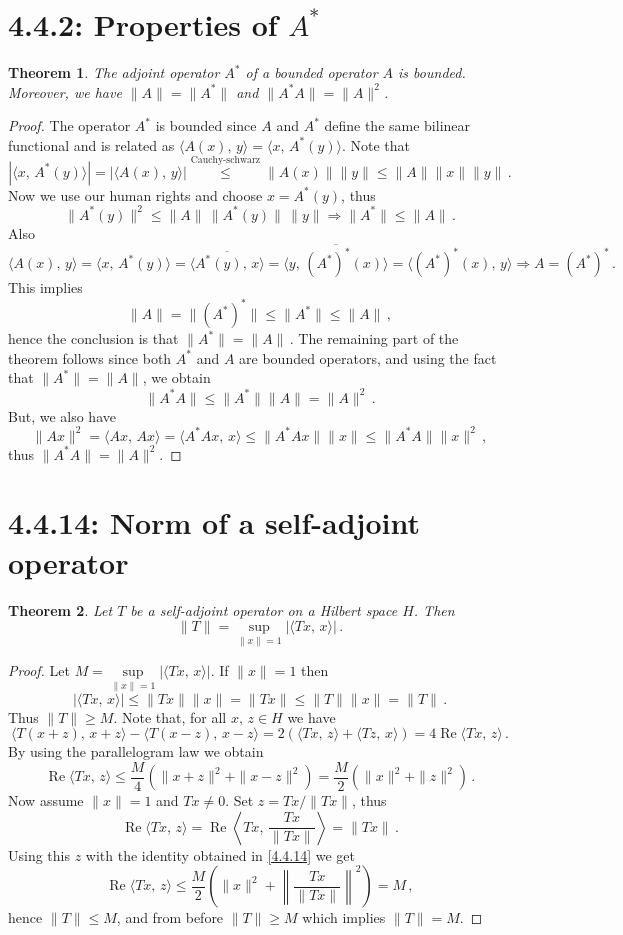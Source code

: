 \documentclass[12pt, a4paper]{article}
\newtheorem{theorem}{Theorem}[section]
\begin{document}
\section{4.4.2: Properties of $A^*$}
\begin{theorem}
The adjoint operator $A^*$ of a bounded operator $A$ is bounded. Moreover, we have $\|A\|=\|A^*\|$ and $\|A^*A\|=\|A\|^2$.
\end{theorem}
\begin{proof}
The operator $A^*$ is bounded since $A$ and $A^*$ define the same bilinear functional and is related as $\langle A(x),\,y\rangle=\langle x,\,A^*(y)\rangle$. Note that
\[
    |\langle x,\,A^*(y)\rangle|=|\langle A(x),\,y\rangle|\overset{\text{Cauchy-schwarz}}{\leq}\|A(x)\|\|y\|\leq \|A\|\|x\|\|y\|\,.
\]
Now we use our human rights and choose $x=A^*(y)$, thus
\[
    \|A^*(y)\|^2\leq \|A\|\,\|A^*(y)\|\,\|y\|\Rightarrow \|A^*\|\leq \|A\|\,.
\]
Also
\[
    \langle A(x),\,y\rangle=\langle x,\,A^*(y)\rangle=\langle\overline{A^*(y),\,x} \rangle=\langle\overline{y,\,(A^*)^*(x)} \rangle=\langle (A^*)^*(x),\,y\rangle\Rightarrow A=(A^*)^*\,.
\]
This implies
\[
    \|A\|=\|(A^*)^*\|\leq \|A^*\|\leq\|A\|\,,
\]
hence the conclusion is that $\|A^*\|=\|A\|\,$. The remaining part of the theorem follows since both $A^*$ and $A$ are bounded operators, and using the fact that $\|A^*\|=\|A\|$, we obtain
\[
    \|A^*A\|\leq \|A^*\|\|A\|=\|A\|^2\,.
\]
But, we also have
\[
    \|Ax\|^2=\langle Ax,\,Ax\rangle=\langle A^*Ax,\,x\rangle\leq \|A^*Ax\|\|x\|\leq \|A^*A\|\|x\|^2\,,
\]
thus $\|A^*A\|=\|A\|^2$.
\end{proof}
\section{4.4.14: Norm of a self-adjoint operator}
\begin{theorem}
Let $T$ be a self-adjoint operator on a Hilbert space $H$. Then
\[
    \|T\|=\underset{\|x\|=1}{\operatorname{sup}}|\langle Tx,\,x\rangle|\,.
\]
\end{theorem}
\begin{proof}
Let $M=\underset{\|x\|=1}{\operatorname{sup}}|\langle Tx,\,x\rangle|$. If $\|x\|=1$ then
\[
    |\langle Tx,\,x\rangle|\leq\|Tx\|\|x\|=\|Tx\|\leq\|T\|\|x\|=\|T\|\,.
\]
Thus $\|T\|\geq M$. Note that, for all $x,\,z\in H$ we have
\[
    \langle T(x+z),\,x+z\rangle-\langle T(x-z),\,x-z\rangle=2(\langle Tx,\,z\rangle+\langle Tz,\,x\rangle)=4\operatorname{Re}\langle Tx,\,z\rangle\,.
\]
By using the parallelogram law we obtain
\begin{equation}
\operatorname{Re}\langle Tx,\,z\rangle\leq\dfrac{M}{4}(\|x+z\|^2+\|x-z\|^2)=\dfrac{M}{2}(\|x\|^2+\|z\|^2)\,.
\label{4.4.14}
\end{equation}
Now assume $\|x\|=1$ and $Tx\neq 0$. Set $z=Tx/\|Tx\|$, thus
\[
    \operatorname{Re}\langle Tx,\,z\rangle=\operatorname{Re}\left\langle Tx,\,\dfrac{Tx}{\|Tx\|}\right\rangle=\|Tx\|\,.
\]
Using this $z$ with the identity obtained in \eqref{4.4.14} we get
\[
    \operatorname{Re}\langle Tx,\,z\rangle\leq\dfrac{M}{2}\left(\|x\|^2+\left\|\dfrac{Tx}{\|Tx\|}\right\|^2\right)=M\,,
\]
hence $\|T\|\leq M$, and from before $\|T\|\geq M$ which implies $\|T\|=M$.
\end{proof}
\end{document}
